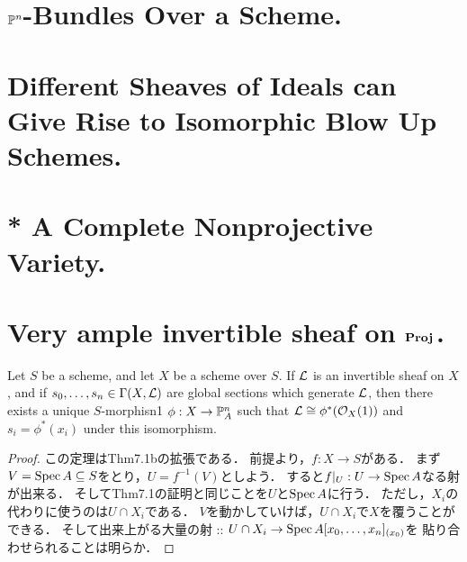 \documentclass[a4paper]{jsarticle}
\begin{document}
\section{$\mathbb{P}^n$-Bundles Over a Scheme.} %

\section{Different Sheaves of Ideals can Give Rise to Isomorphic Blow Up Schemes.} %

\section{ } %

\section{* A Complete Nonprojective Variety.} %

\section{Very ample invertible sheaf on $\mathbf{Proj}\,$.} %
    \begin{Thm}
        Let $S$ be a scheme, and let $X$ be a scheme over $S$.
        If $\mathcal{L}$ is an invertible sheaf on $X$,
        and if $s_0, \dots ,s_n \in \Gamma(X, \mathcal{L})$ are global sections which generate $\mathcal{L}$,
        then there exists a unique $S$-morphisn1 $\phi:X \to \mathbb{P}^n_A$ such that 
        $\mathcal{L} \cong \phi^*(\mathcal{O}_X(1))$ and $s_i = \phi^*(x_i)$ under this isomorphism.
    \end{Thm}
    \begin{proof}
        この定理はThm7.1bの拡張である．
        前提より，$f: X \to S$がある．
        まず$V=\operatorname{Spec} A \subseteq S$をとり，$U=f^{-1}(V)$としよう．
        すると$f|_U: U \to \operatorname{Spec} A$なる射が出来る．
        そしてThm7.1の証明と同じことを$U$と$\operatorname{Spec} A$に行う．
        ただし，$X_i$の代わりに使うのは$U \cap X_i$である．
        $V$を動かしていけば，$U \cap X_i$で$X$を覆うことができる．
        そして出来上がる大量の射 :: $U \cap X_i \to \operatorname{Spec} A[x_0,\dots,x_n]_{(x_0)}$を
        貼り合わせられることは明らか．
    \end{proof}
\end{document}
